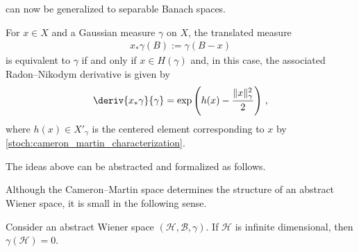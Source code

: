     can now be generalized to separable Banach spaces.
    \begin{theorem}
        For $x\in X$ and a Gaussian measure $\gamma$ on $X$, the translated measure
        \begin{gather}
            x_*\gamma(B) := \gamma(B-x)
        \end{gather}
        is equivalent to $\gamma$ if and only if $x\in H(\gamma)$ and, in this case, the associated Radon--Nikodym derivative is given by
        \begin{gather}
            \deriv{x_*\gamma}{\gamma} = \exp\left(h(x) - \frac{\|x\|_\gamma^2}{2}\right)\,,
        \end{gather}
        where $h(x)\in X'_\gamma$ is the centered element corresponding to $x$ by \cref{stoch:cameron_martin_characterization}.
    \end{theorem}

    The ideas above can be abstracted and formalized as follows.

    Although the Cameron--Martin space determines the structure of an abstract Wiener space, it is small in the following sense.
    \begin{property}
        Consider an abstract Wiener space $(\mathcal{H},\mathcal{B},\gamma)$. If $\mathcal{H}$ is infinite dimensional, then $\gamma(\mathcal{H})=0$.
    \end{property}


